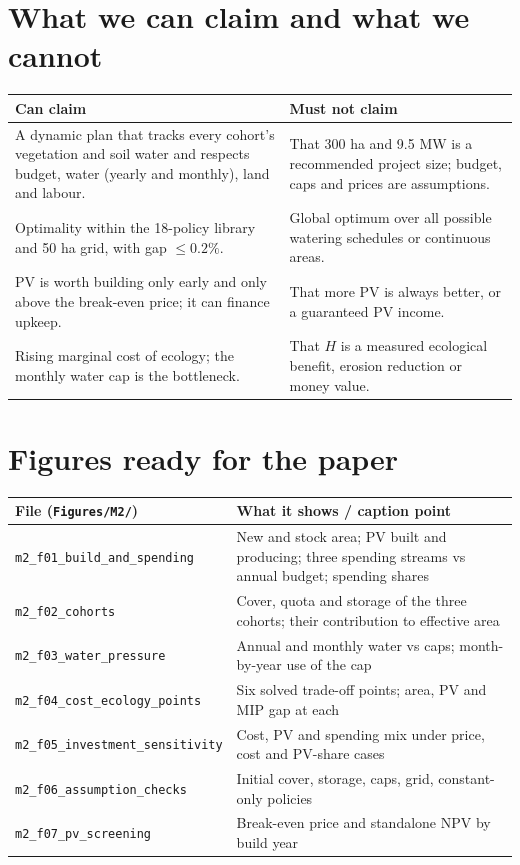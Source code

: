 \documentclass[11pt,a4paper]{article}
\begin{document}
\section{What we can claim and what we cannot}
\begin{tabularx}{\textwidth}{@{}YY@{}}
\toprule
Can claim & Must not claim\\
\midrule
A dynamic plan that tracks every cohort's vegetation and soil water and respects budget, water (yearly and monthly), land and labour. &
That 300 ha and 9.5 MW is a recommended project size; budget, caps and prices are assumptions. \\
Optimality within the 18-policy library and 50 ha grid, with gap $\le0.2\%$. &
Global optimum over all possible watering schedules or continuous areas. \\
PV is worth building only early and only above the break-even price; it can finance upkeep. &
That more PV is always better, or a guaranteed PV income. \\
Rising marginal cost of ecology; the monthly water cap is the bottleneck. &
That $H$ is a measured ecological benefit, erosion reduction or money value. \\
\bottomrule
\end{tabularx}

\section{Figures ready for the paper}
\begin{table}[H]\centering\small
\begin{tabularx}{\textwidth}{@{}lY@{}}
\toprule
File (\texttt{Figures/M2/}) & What it shows / caption point\\
\midrule
\texttt{m2\_f01\_build\_and\_spending} & New and stock area; PV built and producing; three spending streams vs annual budget; spending shares\\
\texttt{m2\_f02\_cohorts} & Cover, quota and storage of the three cohorts; their contribution to effective area\\
\texttt{m2\_f03\_water\_pressure} & Annual and monthly water vs caps; month-by-year use of the cap\\
\texttt{m2\_f04\_cost\_ecology\_points} & Six solved trade-off points; area, PV and MIP gap at each\\
\texttt{m2\_f05\_investment\_sensitivity} & Cost, PV and spending mix under price, cost and PV-share cases\\
\texttt{m2\_f06\_assumption\_checks} & Initial cover, storage, caps, grid, constant-only policies\\
\texttt{m2\_f07\_pv\_screening} & Break-even price and standalone NPV by build year\\
\bottomrule
\end{tabularx}
\end{table}
\end{document}

